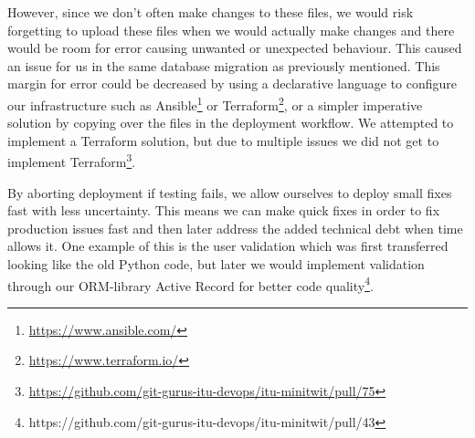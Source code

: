 \documentclass{article}
\begin{document}
However, since we don't often make changes to these files, we would risk forgetting to upload these files when we would actually make changes and there would be room for error causing unwanted or unexpected behaviour.
This caused an issue for us in the same database migration as previously mentioned. This margin for error could be decreased by using a declarative language to configure our infrastructure such as Ansible\footnote{\href{https://www.ansible.com/}{https://www.ansible.com/}} or Terraform\footnote{\href{https://www.terraform.io/}{https://www.terraform.io/}}, or a simpler imperative solution by copying over the files in the deployment workflow. We attempted to implement a Terraform solution, but due to multiple issues we did not get to implement Terraform\footnote{\href{https://github.com/git-gurus-itu-devops/itu-minitwit/pull/75}{https://github.com/git-gurus-itu-devops/itu-minitwit/pull/75}}.

By aborting deployment if testing fails, we allow ourselves to deploy small fixes fast with less uncertainty.
This means we can make quick fixes in order to fix production issues fast and then later address the added technical debt when time allows it.
One example of this is the user validation which was first transferred looking like the old Python code, but later we would implement validation through our ORM-library Active Record for better code quality\footnote{https://github.com/git-gurus-itu-devops/itu-minitwit/pull/43}. 




\end{document}
